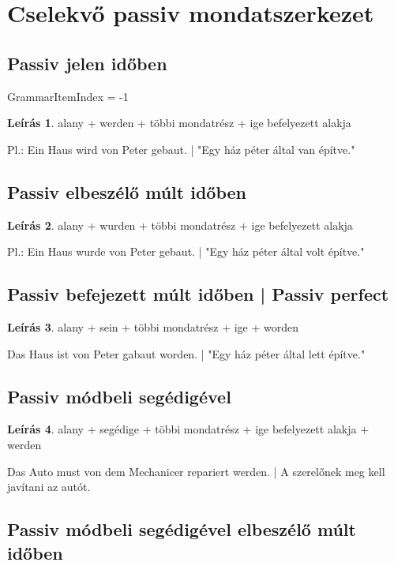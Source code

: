 \documentclass{article}
\theoremstyle{definition}
\newtheorem*{desc}{Leírás}
\begin{document}
\section{Cselekvő passiv mondatszerkezet}

\subsection{Passiv jelen időben}

GrammarItemIndex = -1

\begin{desc}
alany + werden + többi mondatrész + ige befelyezett alakja

Pl.: Ein Haus wird von Peter gebaut. | "Egy ház péter által van építve." 
\end{desc}

\subsection{Passiv elbeszélő múlt időben}

\begin{desc}
alany + wurden + többi mondatrész + ige befelyezett alakja

Pl.: Ein Haus wurde von Peter gebaut. | "Egy ház péter által volt építve."
\end{desc}

\subsection{Passiv befejezett múlt időben | Passiv perfect}

\begin{desc}
alany + sein + többi mondatrész + ige + worden

Das Haus ist von Peter gabaut worden. | "Egy ház péter által lett építve."
\end{desc}

\subsection{Passiv módbeli segédigével}

\begin{desc}
alany + segédige + többi mondatrész + ige befelyezett alakja + werden

Das Auto must von dem Mechanicer repariert werden. | A szerelőnek meg kell javítani az autót.
\end{desc}

\subsection{Passiv módbeli segédigével elbeszélő múlt időben}
\end{document}
